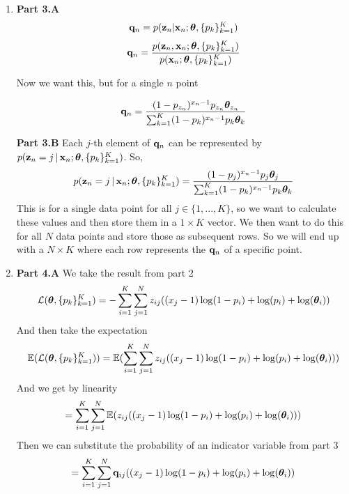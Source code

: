 \documentclass[submit]{harvardml}
\begin{document}
\begin{enumerate}
    \item
        \textbf{Part 3.A }
        \begin{equation*}
            \mathbf{q}_{n} = p(\mathbf{z}_n | \mathbf{x}_n; \boldsymbol{\theta}, \{ p_k \}^K_{k=1})
        \end{equation*}
        \begin{equation*}
            \mathbf{q}_{n} = \frac{p(\mathbf{z}_n, \mathbf{x}_n; \boldsymbol{\theta}, \{ p_k \}^K_{k=1})}{p(\mathbf{x}_n; \boldsymbol{\theta}, \{ p_k \}^K_{k=1})}
        \end{equation*}
        \begin{center}
            Now we want this, but for a single $n$ point
        \end{center}
        \begin{equation*}
            \mathbf{q}_{n} = \frac{(1-p_{z_n})^{x_n - 1}p_{z_n} \boldsymbol{\theta}_{z_n}}{\sum_{k =1}^K (1-p_{k})^{x_n - 1}p_{k} \boldsymbol{\theta}_{k}}
        \end{equation*}
    
        \textbf{Part 3.B }\newline
        Each $j$-th element of $\mathbf{q}_n$ can be represented by $p(\mathbf{z}_n = j\,|\, \mathbf{x}_n; \boldsymbol{\theta}, \{ p_k \}^K_{k=1})$. So,
            \begin{equation*}
                p(\mathbf{z}_n = j\,|\, \mathbf{x}_n; \boldsymbol{\theta}, \{ p_k \}^K_{k=1}) = \frac{(1-p_{j})^{x_n - 1}p_{j} \boldsymbol{\theta}_{j}}{\sum_{k = 1}^K (1-p_{k})^{x_n - 1}p_{k} \boldsymbol{\theta}_{k}}
            \end{equation*}
        This is for a single data point for all $j \in \{1, ... , K\}$, so we want to calculate these values and then store them in a $1 \times K$ vector. We then want to do this for all $N$ data points and store those as subsequent rows. So we will end up with a $N\times K$ where each row represents the $\mathbf{q}_n$ of a specific point.
        
    \item
        \textbf{Part 4.A }\newline
        We take the result from part 2
        \begin{equation*}
            \mathcal{L}(\boldsymbol{\theta}, \{p_k\}^K_{k=1}) = - \sum_{i=1}^K\sum_{j=1}^N z_{ij} ((x_j -1) \log(1 - p_i) + \log(p_i) + \log(\boldsymbol{\theta}_{i}))
        \end{equation*}
        And then take the expectation
        \begin{equation*}
            \mathbb{E}(\mathcal{L}(\boldsymbol{\theta}, \{p_k\}^K_{k=1}))= \mathbb{E}(\sum_{i=1}^K\sum_{j=1}^N z_{ij} ((x_j -1) \log(1 - p_i) + \log(p_i) + \log(\boldsymbol{\theta}_{i})))
        \end{equation*}
        And we get by linearity
        \begin{equation*}
            = \sum_{i=1}^K\sum_{j=1}^N \mathbb{E}(z_{ij} ((x_j -1) \log(1 - p_i) + \log(p_i) + \log(\boldsymbol{\theta}_{i})))
        \end{equation*}
        Then we can substitute the probability of an indicator variable from part 3
        \begin{equation*}
            = \sum_{i=1}^K\sum_{j=1}^N \mathbf{q}_{ij} ((x_j -1) \log(1 - p_i) + \log(p_i) + \log(\boldsymbol{\theta}_{i}))
        \end{equation*}
        

\end{enumerate}
\end{document}
